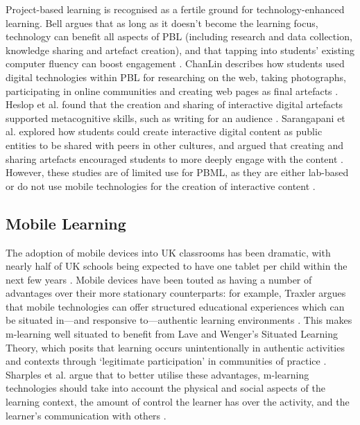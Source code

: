 \documentclass[,hyphens]{sigchi}
\begin{document}
Project-based learning is recognised as a fertile ground for technology-enhanced learning. Bell argues that as long as it doesn't become the learning focus, technology can benefit all aspects of PBL (including research and data collection, knowledge sharing and artefact creation), and that tapping into students' existing computer fluency can boost engagement \cite{Bell2010}. ChanLin describes how students used digital technologies within PBL for researching on the web, taking photographs, participating in online communities and creating web pages as final artefacts \cite{ChanLin2008}. Heslop et al. found that the creation and sharing of interactive digital artefacts supported metacognitive skills, such as writing for an audience \cite{Heslop2017}. Sarangapani et al. explored how students could create interactive digital content as public entities to be shared with peers in other cultures, and argued that creating and sharing artefacts encouraged students to more deeply engage with the content \cite{Sarangapani2018}. However, these studies are of limited use for PBML, as they are either lab-based \cite{Heslop2017} or do not use mobile technologies for the creation of interactive content \cite{Sarangapani2018, ChanLin2008}.

\subsection{Mobile Learning}
The adoption of mobile devices into UK classrooms has been dramatic, with nearly half of UK schools being expected to have one tablet per child within the next few years \cite{BritishEducationalSuppliersAssociation2015}. Mobile devices have been touted as having a number of advantages over their more stationary counterparts: for example, Traxler argues that mobile technologies can offer structured educational experiences which can be situated in---and responsive to---authentic learning environments \cite{Traxler2011}. This makes m-learning well situated to benefit from Lave and Wenger's Situated Learning Theory, which posits that learning occurs unintentionally in authentic activities and contexts through `legitimate participation' in communities of practice \cite{Lave1991}. Sharples et al. argue that to better utilise these advantages, m-learning technologies should take into account the physical and social aspects of the learning context, the amount of control the learner has over the activity, and the learner's communication with others \cite{Sharples2007}.
\end{document}
